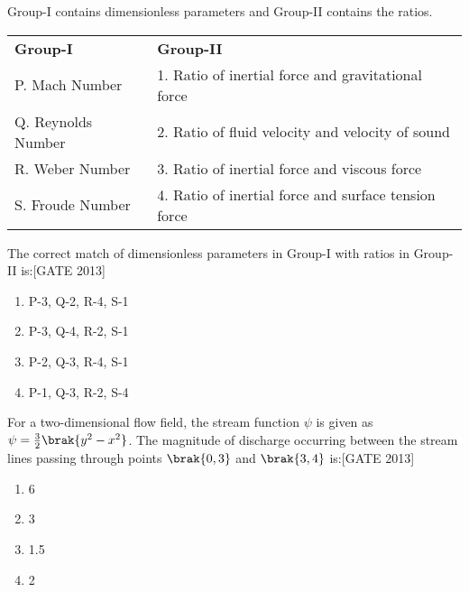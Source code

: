     \item Group-I contains dimensionless parameters and Group-II contains the ratios.
    
    \begin{center}
    \begin{tabular}{p{6cm} p{9cm}}
        \textbf{Group-I} & \textbf{Group-II} \\

        P. Mach Number  & 1. Ratio of inertial force and gravitational force \\ 
        Q. Reynolds Number  & 2. Ratio of fluid velocity and velocity of sound \\
        R. Weber Number  & 3. Ratio of inertial force and viscous force \\ 
        S. Froude Number  & 4. Ratio of inertial force and surface tension force 
       
    \end{tabular}
\end{center}
    The correct match of dimensionless parameters in Group-I with ratios in Group-II is:\hfill{[GATE 2013]}
    
    \begin{multicols}{2}
    \begin{enumerate}
        \item P-3, Q-2, R-4, S-1
        \item P-3, Q-4, R-2, S-1
        \item P-2, Q-3, R-4, S-1
        \item P-1, Q-3, R-2, S-4
    \end{enumerate}
    \end{multicols}

    \item For a two-dimensional flow field, the stream function $\psi$ is given as $\psi = \frac{3}{2}\brak{ y^2 - x^2}$. The magnitude of discharge occurring between the stream lines passing through points $\brak{0,3}$ and $\brak{3,4}$ is:\hfill{[GATE 2013]}
    
    \begin{multicols}{4}
    \begin{enumerate}
        \item 6
        \item 3
        \item 1.5
        \item 2
    \end{enumerate}
    \end{multicols}

